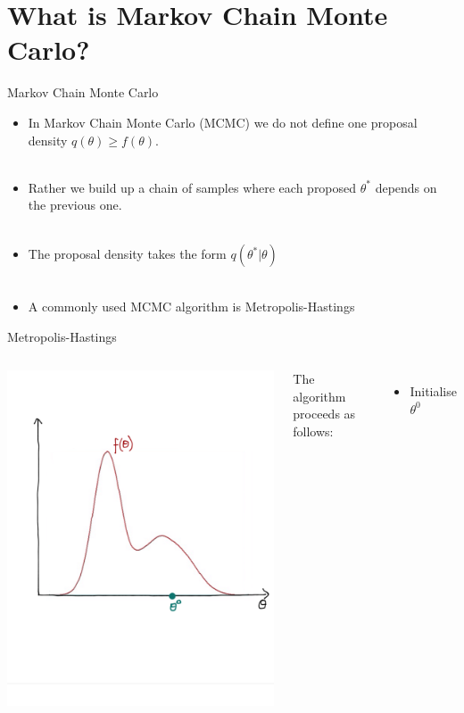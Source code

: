\documentclass[compress]{beamer}
\begin{document}
\section{What is Markov Chain Monte Carlo?}
\label{sec-7}
\begin{frame}[label=sec-7-1]{Markov Chain Monte Carlo}
\begin{itemize}
\item In Markov Chain Monte Carlo (MCMC) we do not define one proposal density $q(\theta) \geqslant f(\theta)$.\\~\\
\item Rather we build up a \alert{chain} of samples where each proposed $\theta^*$ depends on the previous one.\\~\\
\item The proposal density takes the form $q(\theta^* | \theta)$\\~\\
\item A commonly used MCMC algorithm is \alert{Metropolis-Hastings}
\end{itemize}
\end{frame}


\begin{frame}[label=sec-7-2]{Metropolis-Hastings}
\begin{columns}[c] 
\includegraphics[width=0.8\linewidth]{MH1}

The algorithm proceeds as follows:\\
\begin{itemize}
\item Initialise $\theta^{0}$
\end{itemize}
\end{columns}
\end{frame}
\end{document}
